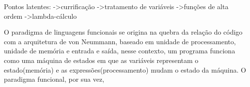Pontos latentes:
->currificação
->tratamento de variáveis
->funções de alta ordem
->lambda-cálculo

O paradigma de linguagens funcionais se origina na quebra da relação do código com a arquitetura de von Neummann, baseado em unidade de processamento, unidade de memória e entrada e saída, nesse contexto, um programa funciona como uma máquina de estados em que as variáveis representam o estado(memória) e as expressões(processamento) mudam o estado da máquina.
O paradigma funcional, por sua vez,  
